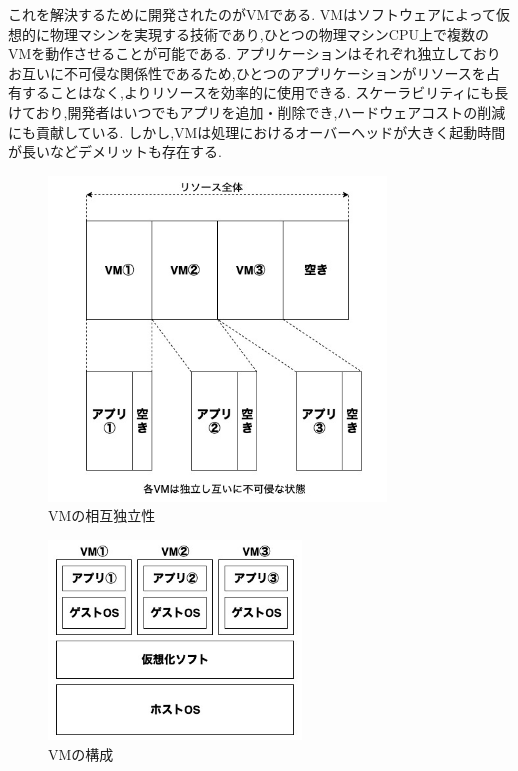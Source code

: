 これを解決するために開発されたのがVMである.
VMはソフトウェアによって仮想的に物理マシンを実現する技術であり,ひとつの物理マシンCPU上で複数のVMを動作させることが可能である.
アプリケーションはそれぞれ独立しておりお互いに不可侵な関係性であるため,ひとつのアプリケーションがリソースを占有することはなく,よりリソースを効率的に使用できる.
スケーラビリティにも長けており,開発者はいつでもアプリを追加・削除でき,ハードウェアコストの削減にも貢献している.
しかし,VMは処理におけるオーバーヘッドが大きく起動時間が長いなどデメリットも存在する.

\begin{figure}[htbp]
\begin{center}
    \includegraphics[width=0.8\textwidth]{./figures/resource-on-vm.jpg}
    \caption{VMの相互独立性}
\end{center}
\end{figure}

\begin{figure}[htbp]
\begin{center}
    \includegraphics[width=0.6\textwidth]{./figures/vm-structure.jpg}
    \caption{VMの構成}
\end{center}
\end{figure}

